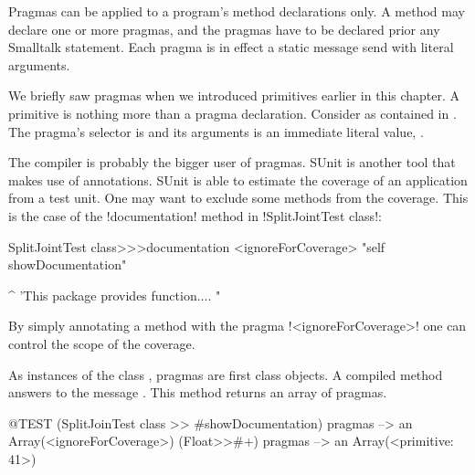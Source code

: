 \documentclass[a4paper,10pt,twoside]{book}
\begin{document}
{Pragmas can be applied to a program's method declarations only. A method may declare one or more pragmas, and the pragmas have to be declared prior any Smalltalk statement. Each pragma is in effect a static message send with literal arguments.

We briefly saw pragmas when we introduced primitives earlier in this chapter. A primitive is nothing more than a pragma declaration. 
Consider  as contained in . The pragma's selector is  and its arguments is an immediate literal value, . 

The compiler is probably the bigger user of pragmas. SUnit is another tool that makes use of annotations. SUnit is able to estimate the coverage of an application from a test unit. One may want to exclude some methods from the coverage. This is the case of the \ct!documentation! method in \ct!SplitJointTest class!:

\begin{code}{}
SplitJointTest class>>>documentation
	<ignoreForCoverage>
	"self showDocumentation"
	
	^ 'This package provides function.... "
\end{code}

By simply annotating a method with the pragma \ct!<ignoreForCoverage>! one can control the scope of the coverage.


%	


As instances of the class , pragmas are first class objects. A compiled method answers to the message . This method returns an array of pragmas. 

\begin{code}{@TEST}
(SplitJoinTest class >> #showDocumentation) pragmas
  --> an Array(<ignoreForCoverage>)
(Float>>#+) pragmas --> an Array(<primitive: 41>)
\end{code}

}
\end{document}
